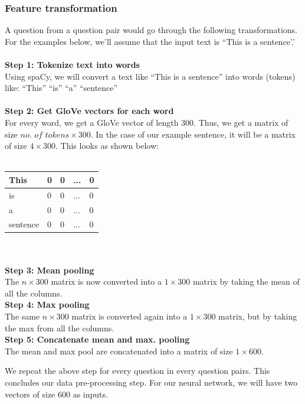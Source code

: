 \documentclass{article}
\begin{document}
\subsubsection{Feature transformation}

A question from a question pair would go through the following transformations. For the examples below, we'll assume that the input text is ``This is a sentence'.'
\\\\
\textbf{Step 1: Tokenize text into words}\\
Using spaCy, we will convert a text like ``This is a sentence'' into words (tokens) like: ``This'' ``is'' ``a'' ``sentence''
\\\\
\textbf{Step 2: Get GloVe vectors for each word}\\
For every word, we get a GloVe vector of length $300$. Thus, we get a matrix of size $\textit{no. of tokens} \times 300$. In the case of our example sentence, it will be a matrix of size $4 \times 300$. This looks as shown below:\\\\

\begin{tabular}{|l|l|l|l|l|}
\hline
This     & 0 & 0 & ... & 0 \\ \hline
is       & 0 & 0 & ... & 0 \\ \hline
a        & 0 & 0 & ... & 0 \\ \hline
sentence & 0 & 0 & ... & 0 \\ \hline
\end{tabular}\\\\

\noindent\textbf{Step 3: Mean pooling}\\
The $n \times 300$ matrix is now converted into a $1 \times 300$ matrix by taking the mean of all the columns.\\

\noindent\textbf{Step 4: Max pooling}\\
The same $n \times 300$ matrix is converted again into a $1 \times 300$ matrix, but by taking the max from all the columns.\\

\noindent\textbf{Step 5: Concatenate mean and max. pooling}\\
The mean and max pool are concatenated into a matrix of size $1 \times 600$.

We repeat the above step for every question in every question pairs. This concludes our data pre-processing step. For our neural network, we will have two vectors of size $600$ as inputs.
\end{document}
